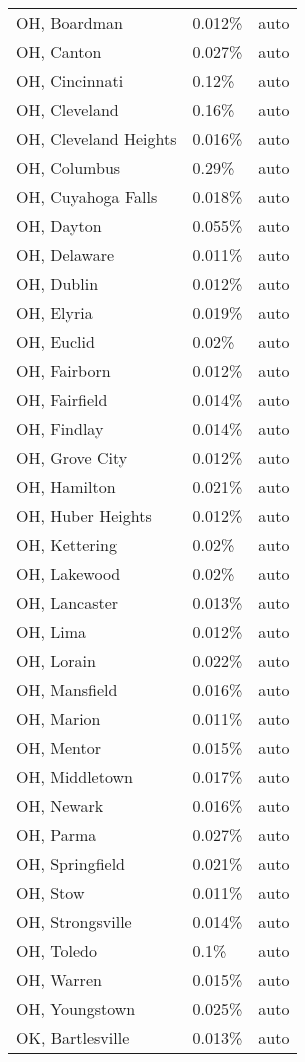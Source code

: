 \begin{longtable}[]{@{}lll@{}}
OH, Boardman & 0.012\% & auto \\
OH, Canton & 0.027\% & auto \\
OH, Cincinnati & 0.12\% & auto \\
OH, Cleveland & 0.16\% & auto \\
OH, Cleveland Heights & 0.016\% & auto \\
OH, Columbus & 0.29\% & auto \\
OH, Cuyahoga Falls & 0.018\% & auto \\
OH, Dayton & 0.055\% & auto \\
OH, Delaware & 0.011\% & auto \\
OH, Dublin & 0.012\% & auto \\
OH, Elyria & 0.019\% & auto \\
OH, Euclid & 0.02\% & auto \\
OH, Fairborn & 0.012\% & auto \\
OH, Fairfield & 0.014\% & auto \\
OH, Findlay & 0.014\% & auto \\
OH, Grove City & 0.012\% & auto \\
OH, Hamilton & 0.021\% & auto \\
OH, Huber Heights & 0.012\% & auto \\
OH, Kettering & 0.02\% & auto \\
OH, Lakewood & 0.02\% & auto \\
OH, Lancaster & 0.013\% & auto \\
OH, Lima & 0.012\% & auto \\
OH, Lorain & 0.022\% & auto \\
OH, Mansfield & 0.016\% & auto \\
OH, Marion & 0.011\% & auto \\
OH, Mentor & 0.015\% & auto \\
OH, Middletown & 0.017\% & auto \\
OH, Newark & 0.016\% & auto \\
OH, Parma & 0.027\% & auto \\
OH, Springfield & 0.021\% & auto \\
OH, Stow & 0.011\% & auto \\
OH, Strongsville & 0.014\% & auto \\
OH, Toledo & 0.1\% & auto \\
OH, Warren & 0.015\% & auto \\
OH, Youngstown & 0.025\% & auto \\
OK, Bartlesville & 0.013\% & auto \\

\end{longtable}
